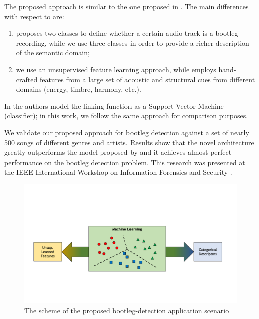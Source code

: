 The proposed approach is similar to the one proposed in \cite{Bestagini2013b}. The main differences with respect to \cite{Bestagini2013b} are:
\begin{enumerate}
\item \cite{Bestagini2013b} proposes two classes to define whether a certain audio track is a bootleg recording, while we use three classes in order to provide a richer description of the semantic domain;
\item we use an unsupervised feature learning approach, while \cite{Bestagini2013b} employs hand-crafted features from a large set of acoustic and structural cues from different domains (energy, timbre, harmony, etc.)\cite{Kim2005}.
\end{enumerate}
In \cite{Bestagini2013b} the authors model the linking function as a Support Vector Machine (classifier); in this work, we follow the same approach for comparison purposes.

We validate our proposed approach for bootleg detection against a set of nearly 500 songs of different genres and artists. Results show that the novel architecture greatly outperforms the model proposed by \cite{Bestagini2013b} and it achieves almost perfect performance on the bootleg detection problem. This research was presented at the IEEE International Workshop on Information Forensics and Security \cite{buccoli2014}.  



 \begin{figure}[tbp]
    \begin{center}
      \includegraphics[trim=1cm 5cm 2.3cm 6.5cm,clip=true,width=\textwidth]{img/Bootleg/schema}
    \end{center}
  \caption{The scheme of the proposed bootleg-detection application scenario}
  \label{fig:Bootleg:scheme}
  \end{figure}

